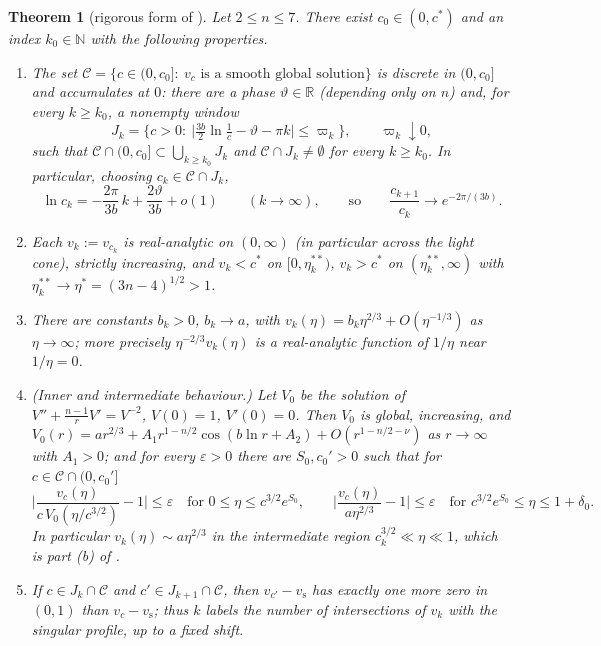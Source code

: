 \documentclass[11pt,a4paper]{amsart}
\newtheorem{theorem}{Theorem}[section]
\theoremstyle{definition}
\theoremstyle{remark}
\newcommand{\R}{\mathbb{R}}
\newcommand{\N}{\mathbb{N}}
\newcommand{\eps}{\varepsilon}
\newcommand{\cstar}{c^{*}}
\newcommand{\vs}{v_{\mathrm{s}}}
\begin{document}
\begin{theorem}[rigorous form of {\cite[Theorem 2.1]{GHL22}}]\label{thm:main}
Let $2\le n\le7$.  There exist $c_0\in(0,\cstar)$ and an index $k_0\in\N$ with the following properties.
\begin{enumerate}
\item\label{it:discrete} The set $\mathcal C=\{c\in(0,c_0]:\ v_c \text{ is a smooth global solution}\}$ is discrete in $(0,c_0]$ and accumulates at $0$: there are a phase $\vartheta\in\R$ (depending only on $n$) and, for every $k\ge k_0$, a nonempty window
\[
J_k=\Big\{c>0:\ \Big|\tfrac{3b}{2}\ln\tfrac1c-\vartheta-\pi k\Big|\le \varpi_k\Big\},\qquad \varpi_k\downarrow0,
\]
such that $\mathcal C\cap(0,c_0]\subset\bigcup_{k\ge k_0}J_k$ and $\mathcal C\cap J_k\neq\emptyset$ for every $k\ge k_0$.  In particular, choosing $c_k\in\mathcal C\cap J_k$, 
\begin{equation}\label{eq:ck}
\ln c_k=-\frac{2\pi}{3b}\,k+\frac{2\vartheta}{3b}+o(1)\qquad(k\to\infty),\qquad\text{so}\qquad \frac{c_{k+1}}{c_k}\to e^{-2\pi/(3b)} .
\end{equation}
\item\label{it:profile} Each $v_k:=v_{c_k}$ is real-analytic on $(0,\infty)$ (in particular across the light cone), strictly increasing, and $v_k<\cstar$ on $[0,\eta_k^{**})$, $v_k>\cstar$ on $(\eta^{**}_k,\infty)$ with $\eta^{**}_k\to\eta^*=(3n-4)^{1/2}>1$.
\item\label{it:infinity} There are constants $b_k>0$, $b_k\to a$, with $v_k(\eta)=b_k\eta^{2/3}+O(\eta^{-1/3})$ as $\eta\to\infty$; more precisely $\eta^{-2/3}v_k(\eta)$ is a real-analytic function of $1/\eta$ near $1/\eta=0$.
\item\label{it:matching} (Inner and intermediate behaviour.)  Let $V_0$ be the solution of $V''+\frac{n-1}{r}V'=V^{-2}$, $V(0)=1$, $V'(0)=0$.  Then $V_0$ is global, increasing, and $V_0(r)=a r^{2/3}+A_1 r^{1-n/2}\cos(b\ln r+A_2)+O(r^{1-n/2-\nu})$ as $r\to\infty$ with $A_1>0$; and for every $\eps>0$ there are $S_0,c_0'>0$ such that for $c\in\mathcal C\cap(0,c_0']$
\[
\Big|\frac{v_c(\eta)}{c\,V_0(\eta/c^{3/2})}-1\Big|\le\eps\quad\text{for }0\le\eta\le c^{3/2}e^{S_0},\qquad
\Big|\frac{v_c(\eta)}{a\eta^{2/3}}-1\Big|\le\eps\quad\text{for }c^{3/2}e^{S_0}\le\eta\le1+\delta_0 .
\]
In particular $v_k(\eta)\sim a\eta^{2/3}$ in the intermediate region $c_k^{3/2}\ll\eta\ll1$, which is part \textup{(b)} of \cite[Theorem 2.1]{GHL22}.
\item\label{it:count} If $c\in J_k\cap\mathcal C$ and $c'\in J_{k+1}\cap\mathcal C$, then $v_{c'}-\vs$ has exactly one more zero in $(0,1)$ than $v_c-\vs$; thus $k$ labels the number of intersections of $v_k$ with the singular profile, up to a fixed shift.
\end{enumerate}
\end{theorem}
\end{document}

